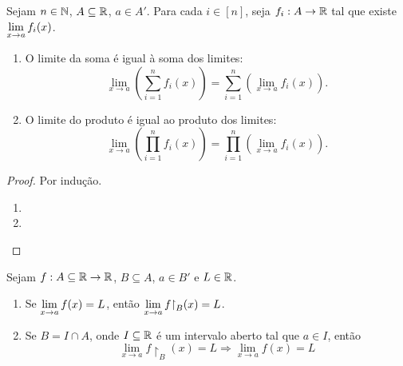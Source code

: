 \begin{corollary}
    Sejam $n \in \mathbb{N}$, $A \subseteq \mathbb{R}$, $a \in A'$. Para cada $i \in [n]$, seja $f_i : A \to \mathbb{R}$ tal que existe $\displaystyle \lim_{x \to a} f_i(x)$.
        \begin{enumerate}[leftmargin=*, align=left, label=\textbf{(\alph*)}]
            \item O limite da soma é igual à soma dos limites:
                \[
                    \lim_{x \to a} \left( \sum_{i=1}^{n} f_i(x) \right) = \sum_{i=1}^{n} \left( \lim_{x \to a} f_i(x) \right).
                \]
            \item O limite do produto é igual ao produto dos limites:
                \[
                    \lim_{x \to a} \left( \prod_{i=1}^{n} f_i(x) \right) = \prod_{i=1}^{n} \left( \lim_{x \to a} f_i(x) \right).
                \]
        \end{enumerate}
\end{corollary}

\begin{proof}
    Por indução.
        \begin{enumerate}[leftmargin=*, align=left, label=\textbf{(\alph*)}]
            \item \blackproof
            \item \blackproof
        \end{enumerate}
\end{proof}

\begin{theorem} 
    Sejam $f : A \subseteq \mathbb{R} \to \mathbb{R}$, $B \subseteq A$, $a \in B'$ e $L \in \mathbb{R}$.
        \begin{enumerate}[leftmargin=*, align=left, label=\textbf{(\alph*)}]
            \item Se $\displaystyle \lim_{x \to a} f(x) = L$, então $\ds \lim_{x \to a} f \restriction_B(x) = L$.
            \item Se $B = I \cap A$, onde $I \subseteq \mathbb{R}$ é um intervalo aberto tal que $a \in I$, então
                \[
                    \lim_{x \to a} f \restriction_{B}(x) = L \Rightarrow \lim_{x \to a} f(x) = L
                \]
        \end{enumerate}
\end{theorem}

